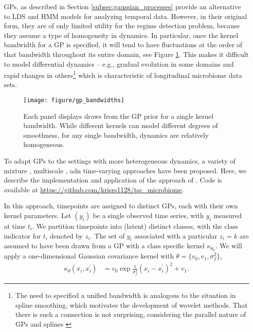 \documentclass{article}
\begin{document}
GPs, as described in Section \ref{subsec:gaussian_processes} provide an
alternative to LDS and HMM models for analyzing temporal data. However, in their
original form, they are of only limited utility for the regime detection
problem, because they assume a type of homogeneity in dynamics. In particular,
once the kernel bandwidth for a GP is specified, it will tend to have
fluctuations at the order of that bandwidth throughout its entire domain, see
Figure \ref{fig:gp_bandwidths}. This makes it difficult to model differential
dynamics -- e.g., gradual evolution in some domains and rapid changes in
others\footnote{The need to specified a unified bandwidth is analogous to the
  situation in spline smoothing, which motivates the development of wavelet
  methods\citep{donoho1995adapting}. That there is such a connection is not
  surprising, considering the parallel nature of GPs and splines
  \citep{kimeldorf1970correspondence}} which is characteristic of longitudinal
microbiome data sets.

\begin{figure}[ht]
  \centering
  \texttt{[image: figure/gp\_bandwidths]}
  \caption{Each panel displays draws from the GP prior for a single kernel
    bandwidth. While different kernels can model different degrees of
    smoothness, for any single bandwidth, dynamics are relatively
    homogeneous. \label{fig:gp_bandwidths} }
\end{figure}

To adapt GPs to the settings with more heterogeneous dynamics, a variety of
mixture \citep{tresp2001mixtures, rasmussen2002infinite}, multiscale
\citep{fox2012multiresolution, samostring}, adn time-varying
\citep{paciorek2003nonstationary, heinonen2016non} approaches have been
proposed. Here, we describe the implementation and application of the approach
of \citep{rasmussen2002infinite}. Code is available at
\url{https://github.com/krisrs1128/tsc_microbiome}.

In this approach, timepoints are assigned to distinct GPs, each with their own
kernel parameters. Let $\left(y_{i}\right)$ be a single observed time series,
with $y_{i}$ measured at time $t_{i}$. We partition timepoints into (latent)
distinct classes, with the class indicator for $t_i$ denoted by $z_i$. The set
of $y_i$ associated with a particular $z_i = k$ are assumed to have been drawn
from a GP with a class specific kernel $\kappa_{\theta_k}$. We will apply a
one-dimensional Gaussian covariance kernel with $\theta = \{v_0, v_1, \sigma_f^2\}$,
\begin{align*}
  \kappa_\theta\left(x_i, x_i^\prime\right) &= v_0 \exp{\frac{1}{\sigma_f^2} \left(x_i - x_i^\prime\right)^2} + v_1.
\end{align*}
\end{document}
